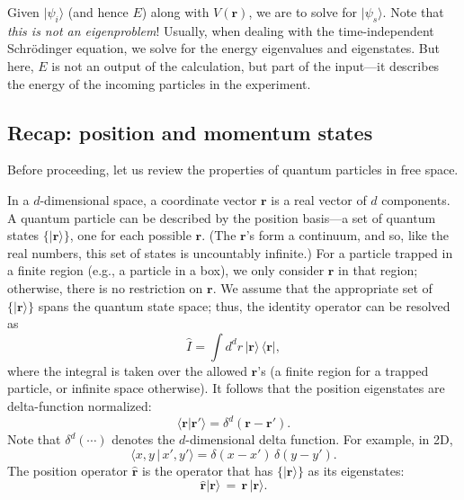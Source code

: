 \documentclass[pra,11pt]{revtex4}
\begin{document}
Given $|\psi_i\rangle$ (and hence $E$) along with $V(\mathbf{r})$, we
are to solve for $|\psi_s\rangle$.  Note that \textit{this is not an
  eigenproblem}!  Usually, when dealing with the time-independent
Schr\"odinger equation, we solve for the energy eigenvalues and
eigenstates.  But here, $E$ is not an output of the calculation, but
part of the input---it describes the energy of the incoming particles
in the experiment.

\subsection{Recap: position and momentum states}

Before proceeding, let us review the properties of quantum particles
in free space.

In a $d$-dimensional space, a coordinate vector $\mathbf{r}$ is a real
vector of $d$ components.  A quantum particle can be described by the
position basis---a set of quantum states $\{|\mathbf{r}\rangle\}$, one
for each possible $\mathbf{r}$.  (The $\mathbf{r}$'s form a continuum,
and so, like the real numbers, this set of states is uncountably
infinite.)  For a particle trapped in a finite region (e.g., a
particle in a box), we only consider $\mathbf{r}$ in that region;
otherwise, there is no restriction on $\mathbf{r}$.  We assume that
the appropriate set of $\{|\mathbf{r}\rangle\}$ spans the quantum
state space; thus, the identity operator can be resolved as
$$\hat{I} = \int d^dr \, |\mathbf{r}\rangle \,\langle\mathbf{r}|,$$
where the integral is taken over the allowed $\mathbf{r}$'s (a finite
region for a trapped particle, or infinite space otherwise).  It
follows that the position eigenstates are delta-function normalized:
$$\langle \mathbf{r} | \mathbf{r}' \rangle = \delta^d(\mathbf{r}-\mathbf{r}').$$
Note that $\delta^d(\cdots)$ denotes the $d$-dimensional delta
function.  For example, in 2D,
$$\langle x,y \,|\, x',y' \rangle = \delta(x-x') \, \delta(y-y').$$
The position operator $\hat{\mathbf{r}}$ is the operator that has
$\{|\mathbf{r}\rangle\}$ as its eigenstates:
$$\hat{\mathbf{r}} |\mathbf{r}\rangle \,=\, \mathbf{r}\, |\mathbf{r}\rangle.$$
\end{document}
